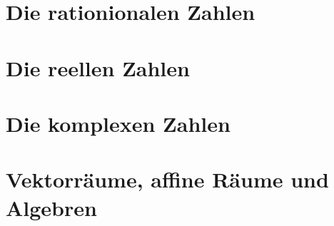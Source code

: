 \section{Die rationionalen Zahlen}
\section{Die reellen Zahlen}
\section{Die komplexen Zahlen}
\section{Vektorräume, affine Räume und Algebren}
